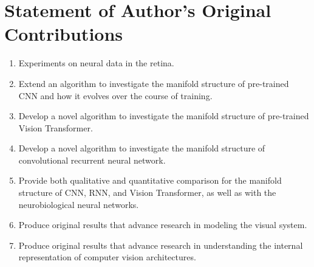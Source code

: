 \chapter{Statement of Author's Original Contributions} 
\label{chapter-contributions} 

\begin{enumerate}
    \item Experiments on neural data in the retina. 
    \item Extend an algorithm to investigate the manifold structure of pre-trained CNN and how it evolves over the course of training. 
    \item Develop a novel algorithm to investigate the manifold structure of pre-trained Vision Transformer.
    \item Develop a novel algorithm to investigate the manifold structure of convolutional recurrent neural network.
    \item Provide both qualitative and quantitative comparison for the manifold structure of CNN, RNN, and Vision Transformer, as well as with the neurobiological neural networks. 
    \item Produce original results that advance research in modeling the visual system.
    \item Produce original results that  advance research in understanding the internal representation of computer vision architectures. 
\end{enumerate}

